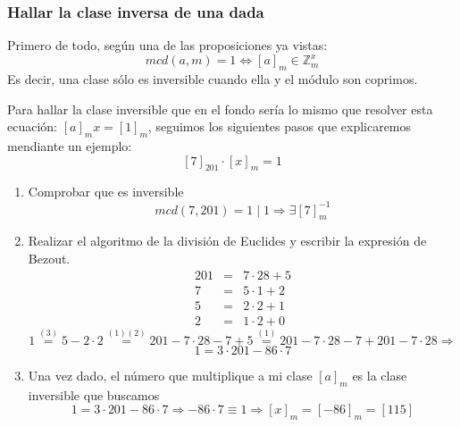 \documentclass[10pt,a4paper,openright]{book}
\begin{document}
\subsubsection*{Hallar la clase inversa de una dada}
Primero de todo, según una de las proposiciones ya vistas:
$$mcd(a,m)=1\Leftrightarrow [a]_m\in \mathbb Z_m^x$$
Es decir, una clase sólo es inversible cuando ella y el módulo son coprimos.\par
Para hallar la clase inversible que en el fondo sería lo mismo que resolver esta ecuación: $[a]_mx=[1]_m$, seguimos los siguientes pasos que explicaremos mendiante un ejemplo:
$$[7]_{201}\cdot [x]_m=1$$
\begin{enumerate}
\item Comprobar que es inversible
$$mcd(7,201)=1\mid 1\Rightarrow \exists [7]_m^{-1}$$
\item Realizar el algoritmo de la división de Euclides y escribir la expresión de Bezout.
\begin{eqnarray}
201 &=& 7\cdot 28 + 5 \\
7   &=& 5\cdot 1 + 2 \\
5   &=& 2\cdot 2 + 1 \\
2	&=& 1\cdot 2 + 0
\end{eqnarray}
$$1\stackrel{(3)}{=}5-2\cdot 2\stackrel{(1)(2)}{=}201-7\cdot 28-7+5\stackrel{(1)}{=}201-7\cdot 28-7+201-7\cdot 28\Rightarrow$$
$$1=3\cdot 201 -86\cdot 7$$
\item Una vez dado, el número que multiplique a mi clase $[a]_m$ es la clase inversible que buscamos
$$1=3\cdot 201 -86\cdot 7\Rightarrow -86\cdot 7\equiv 1\Rightarrow [x]_m=[-86]_m=[115]$$
\end{enumerate}
\end{document}
